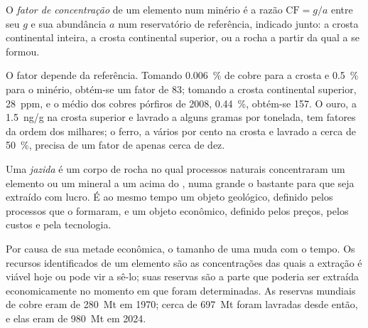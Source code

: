 \begin{definition}\label{def:b2:ore-deposits:cf}
O \emph{fator de concentração} de um elemento num minério é a razão
$\mathrm{CF} = g/a$ entre seu  $g$ e sua abundância $a$ num reservatório de referência, indicado junto:
a crosta continental inteira, a crosta continental superior, ou a rocha a partir da qual a  se formou.
\end{definition}

O fator depende da referência. Tomando \qty{0.006}{\percent} de cobre para a crosta e
\qty{0.5}{\percent} para o minério, obtém-se um fator de 83; tomando a crosta continental superior,
\qty{28}{ppm}, e o  médio dos cobres pórfiros de 2008, \qty{0.44}{\percent}, obtém-se 157. O ouro,
a \qty{1.5}{ng/g} na crosta superior e lavrado a alguns gramas por tonelada, tem fatores da ordem dos
milhares; o ferro, a vários por cento na crosta e lavrado a cerca de \qty{50}{\percent}, precisa
de um fator de apenas cerca de dez.

\begin{definition}[Jazida]\label{def:b2:ore-deposits:deposit}
Uma \emph{jazida} é um corpo de rocha no qual processos naturais
concentraram um elemento ou um mineral a um  acima do , numa  grande o bastante
para que seja extraído com lucro. É ao mesmo tempo um objeto geológico, definido pelos processos que
o formaram, e um objeto econômico, definido pelos preços, pelos custos e pela tecnologia.
\end{definition}

Por causa de sua metade econômica, o tamanho de uma  muda com o tempo. Os recursos identificados
de um elemento são as concentrações das quais a extração é viável hoje ou pode vir a sê-lo; suas
reservas são a parte que poderia ser extraída economicamente no momento em que foram determinadas. As reservas mundiais
de cobre eram de \qty{280}{Mt} em 1970; cerca de \qty{697}{Mt} foram lavradas desde então, e elas
eram de \qty{980}{Mt} em 2024.

